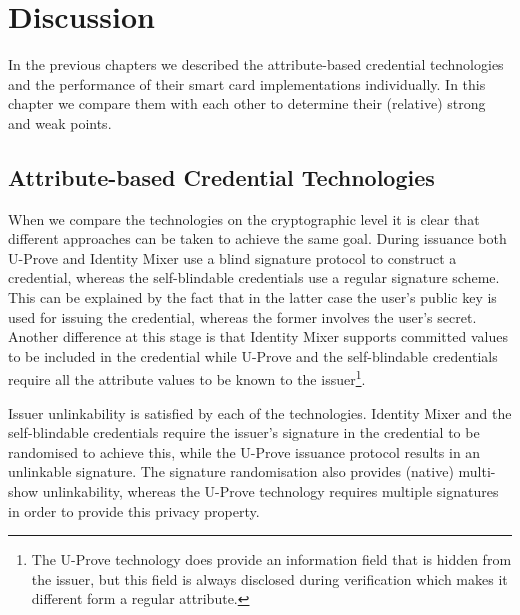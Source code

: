 \chapter{Discussion\label{chp:discussion}}

In the previous chapters we described the attribute-based credential
technologies and the performance of their smart card implementations
individually. In this chapter we compare them with each other to determine their
(relative) strong and weak points.

\section{Attribute-based Credential Technologies}

When we compare the technologies on the cryptographic level it is clear that
different approaches can be taken to achieve the same goal. During issuance both
U-Prove and Identity Mixer use a blind signature protocol to construct a
credential, whereas the self-blindable credentials use a regular signature
scheme. This can be explained by the fact that in the latter case the user's
public key is used for issuing the credential, whereas the former involves the
user's secret. Another difference at this stage is that Identity Mixer supports
committed values to be included in the credential while U-Prove and the
self-blindable credentials require all the attribute values to be known to the
issuer\footnote{The U-Prove technology does provide an information field that
is hidden from the issuer, but this field is always disclosed during
verification which makes it different form a regular attribute.}.

Issuer unlinkability is satisfied by each of the technologies. Identity Mixer
and the self-blindable credentials require the issuer's signature in the
credential to be randomised to achieve this, while the U-Prove issuance protocol
results in an unlinkable signature. The signature randomisation also provides
(native) multi-show unlinkability, whereas the U-Prove technology requires
multiple signatures in order to provide this privacy property.

